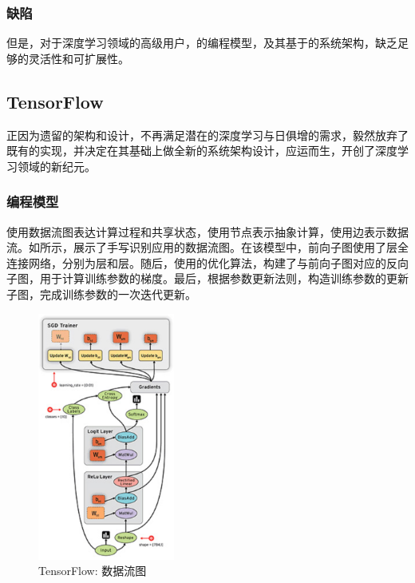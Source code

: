 \begin{content}
\subsubsection{缺陷}


但是，对于深度学习领域的高级用户，的编程模型，及其基于的系统架构，缺乏足够的灵活性和可扩展性。

\begin{enum}
\end{enum}

\subsection{TensorFlow}

正因为遗留的架构和设计，不再满足潜在的深度学习与日俱增的需求，毅然放弃了既有的实现，并决定在其基础上做全新的系统架构设计，应运而生，开创了深度学习领域的新纪元。

\subsubsection{编程模型}


使用数据流图表达计算过程和共享状态，使用节点表示抽象计算，使用边表示数据流。如所示，展示了手写识别应用的数据流图。在该模型中，前向子图使用了层全连接网络，分别为层和层。随后，使用的优化算法，构建了与前向子图对应的反向子图，用于计算训练参数的梯度。最后，根据参数更新法则，构造训练参数的更新子图，完成训练参数的一次迭代更新。

\begin{figure}[H]
\centering
\includegraphics[width=0.4\textwidth]{figures/tf-dataflow.png}
\caption{TensorFlow: 数据流图}
 \label{fig:tf-dataflow}
\end{figure}


\end{content}
